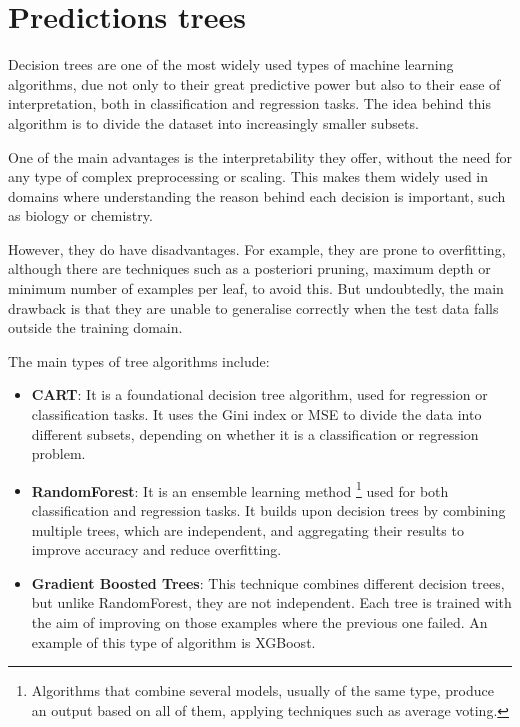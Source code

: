 \section{Predictions trees}

Decision trees are one of the most widely used types of machine learning algorithms, due not only to their great predictive power but also to their ease of interpretation, both in classification and regression tasks. The idea behind this algorithm is to divide the dataset into increasingly smaller subsets.

One of the main advantages is the interpretability they offer, without the need for any type of complex preprocessing or scaling. This makes them widely used in domains where understanding the reason behind each decision is important, such as biology or chemistry.

However, they do have disadvantages. For example, they are prone to overfitting, although there are techniques such as a posteriori pruning, maximum depth or minimum number of examples per leaf, to avoid this. But undoubtedly, the main drawback is that they are unable to generalise correctly when the test data falls outside the training domain.

The main types of tree algorithms include:

\begin{itemize}
    \item \textbf{CART}: It is a foundational decision tree algorithm, used for regression or classification tasks. It uses the Gini index or MSE to divide the data into different subsets, depending on whether it is a classification or regression problem.
    \item \textbf{RandomForest}: It is an ensemble learning method \footnote{Algorithms that combine several models, usually of the same type, produce an output based on all of them, applying techniques such as average voting.} used for both classification and regression tasks. It builds upon decision trees by combining multiple trees, which are independent, and aggregating their results to improve accuracy and reduce overfitting.
    \item \textbf{Gradient Boosted Trees}: This technique combines different decision trees, but unlike RandomForest, they are not independent. Each tree is trained with the aim of improving on those examples where the previous one failed. An example of this type of algorithm is XGBoost.
\end{itemize}

